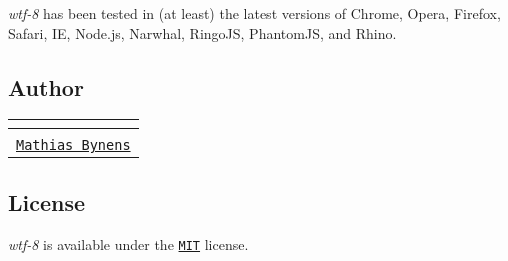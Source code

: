 {\itshape wtf-\/8} has been tested in (at least) the latest versions of Chrome, Opera, Firefox, Safari, IE, Node.\+js, Narwhal, Ringo\+JS, Phantom\+JS, and Rhino.

\subsection*{Author}

\tabulinesep=1mm
\begin{longtabu} spread 0pt [c]{*{1}{|X[-1]}|}
\hline
\rowcolor{\tableheadbgcolor}\textbf{ \href{https://twitter.com/mathias}{\tt }  }\\
\endfirsthead
\hline
\endfoot
\hline
\rowcolor{\tableheadbgcolor}\textbf{ \href{https://twitter.com/mathias}{\tt }  }\\
\endhead
\href{https://mathiasbynens.be/}{\tt Mathias Bynens} \\
\end{longtabu}
\subsection*{License}

{\itshape wtf-\/8} is available under the \href{https://mths.be/mit}{\tt M\+IT} license. 